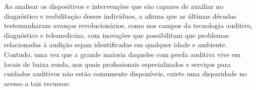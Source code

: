 

Ao analisar os dispositivos e intervenções que são capazes de auxiliar no diagnóstico e reabilitação desses indivíduos, a  afirma que as últimas décadas testemunharam avanços revolucionários, como nos campos da tecnologia auditiva, diagnóstico e telemedicina, com inovações que possibilitam que problemas relacionadas à audição sejam identificadas em qualquer idade e ambiente.
Contudo, uma vez que a grande maioria daqueles com perda auditiva vive em locais de baixa renda, nos quais profissionais especializados e serviços para cuidados auditivos não estão comumente disponíveis, existe uma disparidade no acesso a tais recursos:




